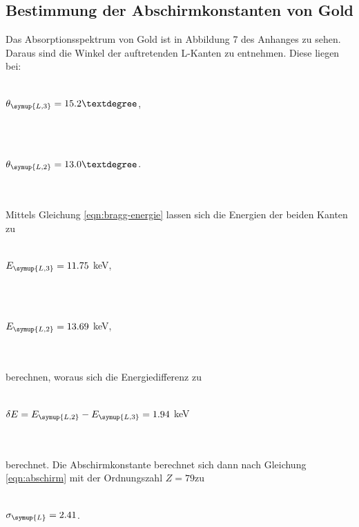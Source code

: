         \subsection{Bestimmung der Abschirmkonstanten von Gold}
        Das Absorptionsspektrum von Gold ist in Abbildung 7 des Anhanges zu sehen. Daraus sind die Winkel der auftretenden L-Kanten zu entnehmen.
        Diese liegen bei:
        \\ \\
        \centerline{$\theta_{\symup{L,3}} = 15.2°$,}
        \\ \\
        \centerline{$\theta_{\symup{L,2}} = 13.0°$.}
        \\ \\
        Mittels Gleichung \eqref{eqn:bragg-energie} lassen sich die Energien der beiden Kanten zu
        \\ \\
        \centerline{$E_{\symup{L,3}} = 11.75$ keV,}
        \\ \\
        \centerline{$E_{\symup{L,2}} = 13.69$ keV,}
        \\ \\
        berechnen, woraus sich die Energiedifferenz zu
        \\ \\
        \centerline{$\delta E = E_{\symup{L,2}} - E_{\symup{L,3}} = 1.94$ keV}
        \\ \\
        berechnet. Die Abschirmkonstante berechnet sich dann nach Gleichung \eqref{eqn:abschirm} mit der Ordnungszahl $Z = 79$zu 
        \\ \\
        \centerline{$\sigma_{\symup{L}} = 2.41$.}
        \\ \\
        



